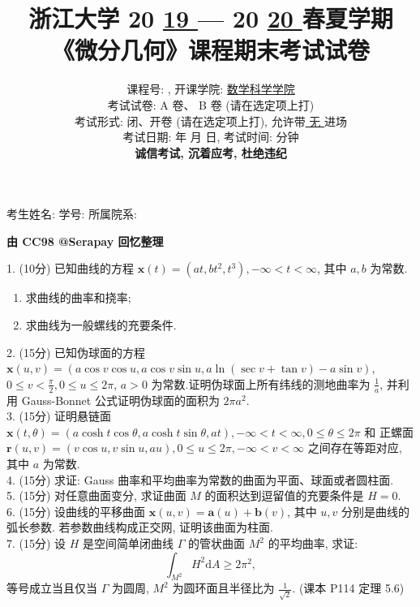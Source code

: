 \documentclass[UTF8]{ctexart}
\title{
\textbf{浙江大学 }20 \underline{ 19 } — 20 \underline{ 20 } \textbf{春夏学期} \\
\textbf{《微分几何》课程期末考试试卷}
}
\author{
课程号: \underline{ \quad 06121530 \quad }, 开课学院: \underline{ \quad 数学科学学院 \quad } \\
考试试卷: \checkmark A 卷、 B 卷 (请在选定项上打\checkmark) \\
考试形式: \checkmark 闭、开卷 (请在选定项上打\checkmark), 允许带\underline{ \quad 无 \quad  }进场 \\
考试日期: \underline{ \quad 2020 \quad } 年 \underline{ \quad 09 \quad } 月 \underline{ \quad 02 \quad } 日, 考试时间: \underline{ \quad 120 \quad }分钟 \\
\textbf{诚信考试, 沉着应考, 杜绝违纪}
}
\date{}
\renewcommand{\d}{\text{d}}
\begin{document}
\maketitle

\begin{center}
考生姓名: \underline{\quad\quad\quad\quad\quad\quad\quad\quad\quad}  学号: \underline{\quad\quad\quad\quad\quad\quad\quad\quad\quad}  所属院系: \underline{\quad\quad\quad\quad\quad\quad\quad\quad\quad}
\end{center}

\centerline{\Large{\textbf{由 CC98 @Serapay 回忆整理}}}

1. (10分) 已知曲线的方程 $\textbf{x}(t)=(at,bt^2,t^3),-\infty<t<\infty$, 其中 $a,b$ 为常数.
\begin{enumerate}[(1)]
    \item 求曲线的曲率和挠率;
    \item 求曲线为一般螺线的充要条件.
\end{enumerate}

2. (15分) 已知伪球面的方程 $\textbf{x}(u,v)=(a\cos v\cos u,a\cos v\sin u,a\ln(\sec v+\tan v)-a\sin v)$,
$0\le v<\displaystyle\frac{\pi}{2},0\le u\le 2\pi$, $a>0$ 为常数.证明伪球面上所有纬线的测地曲率为 $\displaystyle\frac{1}{a}$,
并利用 Gauss-Bonnet 公式证明伪球面的面积为 $2\pi a^2$.
\\

3. (15分) 证明悬链面 $\textbf{x}(t,\theta)=(a\cosh t\cos\theta,a\cosh t\sin\theta,at),-\infty<t<\infty,0\le\theta\le2\pi$ 和
正螺面 $\textbf{r}(u,v)=(v\cos u,v\sin u,au),0\le u\le2\pi,-\infty<v<\infty$ 之间存在等距对应, 其中 $a$ 为常数.
\\

4. (15分) 求证: Gauss 曲率和平均曲率为常数的曲面为平面、球面或者圆柱面.
\\

5. (15分) 对任意曲面变分, 求证曲面 $M$ 的面积达到逗留值的充要条件是 $H=0$.
\\

6. (15分) 设曲线的平移曲面 $\textbf{x}(u,v)=\textbf{a}(u)+\textbf{b}(v)$, 其中 $u,v$ 分别是曲线的弧长参数. 若参数曲线构成正交网, 证明该曲面为柱面.
\\

7. (15分) 设 $H$ 是空间简单闭曲线 $\Gamma$ 的管状曲面 $M^2$ 的平均曲率, 求证:
\[
\int_{M^2}H^2\d A\ge2\pi^2,
\]
等号成立当且仅当 $\Gamma$ 为圆周, $M^2$ 为圆环面且半径比为 $\displaystyle\frac{1}{\sqrt{2}}$. (课本 P114 定理 5.6)
\end{document}
